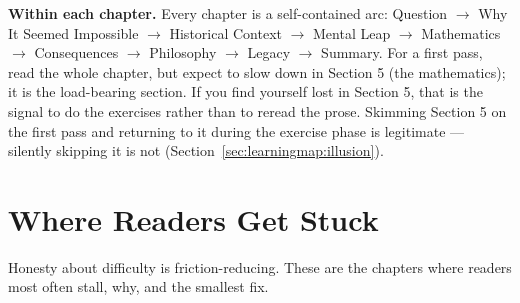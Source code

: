 \textbf{Within each chapter.} Every chapter is a self-contained arc: Question $\to$ Why It Seemed Impossible $\to$ Historical Context $\to$ Mental Leap $\to$ Mathematics $\to$ Consequences $\to$ Philosophy $\to$ Legacy $\to$ Summary. For a first pass, read the whole chapter, but expect to slow down in Section 5 (the mathematics); it is the load-bearing section. If you find yourself lost in Section 5, that is the signal to do the exercises rather than to reread the prose. Skimming Section 5 on the first pass and returning to it during the exercise phase is legitimate --- silently skipping it is not (Section~\ref{sec:learningmap:illusion}).

\section{Where Readers Get Stuck}
\label{sec:learningmap:stuck}

Honesty about difficulty is friction-reducing. These are the chapters where readers most often stall, why, and the smallest fix. 

